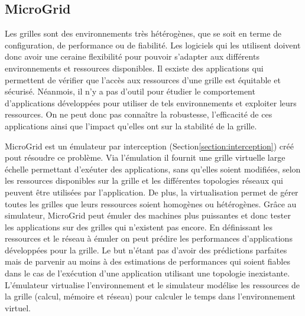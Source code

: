 \subsection{MicroGrid}
\label{subsection:MicroGrid}

Les grilles sont des environnements très hétérogènes, que se soit en terme de configuration, de performance ou de fiabilité. Les logiciels qui les utilisent doivent donc avoir une ceraine flexibilité pour pouvoir s'adapter aux différents environnements et ressources disponibles. Il esxiste des applications qui permettent de vérifier que l'accès aux ressources d'une grille est équitable et sécurisé. Néanmois, il n'y a pas d'outil pour étudier le comportement d'applications développées pour utiliser de tels environnements et exploiter leurs ressources. On ne peut donc pas connaître la robustesse, l'efficacité de ces applications ainsi que l'impact qu'elles ont sur la stabilité de la grille. 

MicroGrid \citep{MICROGRID_INIT, MICROGRID_CASANOVA} est un émulateur par interception (Section\ref{section:interception}) créé pout résoudre ce problème. Via l'émulation il fournit une grille virtuelle large échelle permettant d'exéuter des applications, sans qu'elles soient modifiées, selon les ressources disponibles sur la grille et les différentes topologies réseaux qui peuvent être utilisées par l'application. De plus, la virtualisation permet de gérer toutes les grilles que leurs ressources soient homogènes ou hétérogènes. Grâce au simulateur, %
MicroGrid peut émuler des machines plus puissantes et donc tester les applications sur des grilles qui n'existent pas encore. En définissant les ressources et le réseau à émuler on peut prédire les performances d'applications développées pour la grille. Le but n'étant pas d'avoir des prédictions parfaites mais de parvenir au moins à des estimations de performances qui soient fiables dans le cas de l'exécution d'une application utilisant une topologie inexistante. L'émulateur virtualise l'environnement et le simulateur modélise les ressources de la grille (calcul, mémoire et réseau) pour calculer le temps dans l'environnement virtuel.

